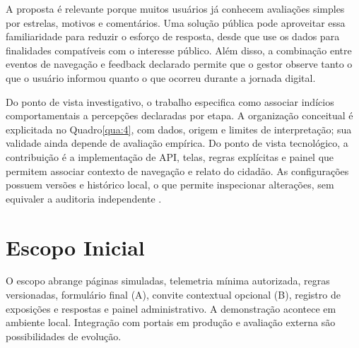 A proposta é relevante porque muitos usuários já conhecem avaliações simples por estrelas, motivos e comentários. Uma solução pública pode aproveitar essa familiaridade para reduzir o esforço de resposta, desde que use os dados para finalidades compatíveis com o interesse público. Além disso, a combinação entre eventos de navegação e feedback declarado permite que o gestor observe tanto o que o usuário informou quanto o que ocorreu durante a jornada digital.

Do ponto de vista investigativo, o trabalho especifica como associar indícios comportamentais a percepções declaradas por etapa. A organização conceitual é explicitada no Quadro\nobreakspace{}\ref{qua:4}, com dados, origem e limites de interpretação; sua validade ainda depende de avaliação empírica. Do ponto de vista tecnológico, a contribuição é a implementação de API, telas, regras explícitas e painel que permitem associar contexto de navegação e relato do cidadão. As configurações possuem versões e histórico local, o que permite inspecionar alterações, sem equivaler a auditoria independente \cite{delone2003,hevner2004,sommerville2011}.

\section{Escopo Inicial}
\label{sec:1.6}

O escopo abrange páginas simuladas, telemetria mínima autorizada, regras versionadas, formulário final (A), convite contextual opcional (B), registro de exposições e respostas e painel administrativo. A demonstração acontece em ambiente local. Integração com portais em produção e avaliação externa são possibilidades de evolução.
